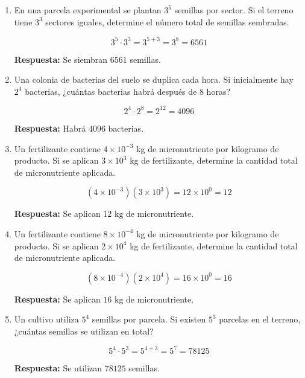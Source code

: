 \documentclass[12pt]{article}
\begin{document}
	\begin{enumerate}[start=9]
		
		\item En una parcela experimental se plantan \(3^5\) semillas por sector.  
		Si el terreno tiene \(3^3\) sectores iguales, determine el número total de semillas sembradas.
		
		\[
		3^5\cdot 3^3=3^{5+3}=3^8=6561
		\]
		
		\textbf{Respuesta:} Se siembran \(\boxed{6561}\) semillas.
		
		\item Una colonia de bacterias del suelo se duplica cada hora.  
		Si inicialmente hay \(2^4\) bacterias, ¿cuántas bacterias habrá después de 8 horas?
		
		\[
		2^4\cdot 2^8=2^{12}=4096
		\]
		
		\textbf{Respuesta:} Habrá \(\boxed{4096}\) bacterias.
		
		\item Un fertilizante contiene \(4\times10^{-3}\) kg de micronutriente por kilogramo de producto.  
		Si se aplican \(3\times10^3\) kg de fertilizante, determine la cantidad total de micronutriente aplicada.
		
		\[
		(4\times10^{-3})(3\times10^3)
		=12\times10^0
		=12
		\]
		
		\textbf{Respuesta:} Se aplican \(\boxed{12\text{ kg}}\) de micronutriente.
		
		\item Un fertilizante contiene \(8\times10^{-4}\) kg de micronutriente por kilogramo de producto.  
		Si se aplican \(2\times10^4\) kg de fertilizante, determine la cantidad total de micronutriente aplicada.
		
		\[
		(8\times10^{-4})(2\times10^4)
		=16\times10^0
		=16
		\]
		
		\textbf{Respuesta:} Se aplican \(\boxed{16\text{ kg}}\) de micronutriente.
		
		\item Un cultivo utiliza \(5^4\) semillas por parcela.  
		Si existen \(5^3\) parcelas en el terreno, ¿cuántas semillas se utilizan en total?
		
		\[
		5^4\cdot 5^3=5^{4+3}=5^7=78125
		\]
		
		\textbf{Respuesta:} Se utilizan \(\boxed{78125}\) semillas.
		
	\end{enumerate}
	
\end{document}
